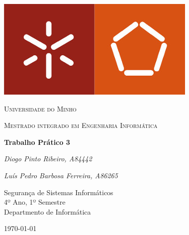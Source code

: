 \documentclass[12pt]{article}
\begin{document}
\thispagestyle{empty}
\setlength\headheight{0pt} 
\begin{center}

\begin{center}
\includegraphics[width=0.45\linewidth]{img/um_logo.jpg}            
\end{center}	

        \vspace{0.25cm}
        {\scshape\LARGE Universidade do Minho \par}
        \vspace{0.25cm}
        {\scshape\Large Mestrado integrado em Engenharia Informática\par}
        \vspace{0.5cm}

        {\Large\bfseries Trabalho Prático 3\par}
        
        \vspace{0.5cm}
        {\Large\itshape Diogo Pinto Ribeiro, A84442\par}
        {\Large\itshape Luís Pedro Barbosa Ferreira, A86265\par}
        \vspace{0.25cm}

\vspace{1cm}
Segurança de Sistemas Informáticos \\
4º Ano, 1º Semestre \\
Departmento de Informática\par
\vspace{1.5cm}
\large
\today

\end{center}

\clearpage
\restoregeometry
\justify

%
%
%

\renewcommand{\contentsname}{Contents}
\pagebreak

 






\printbibliography
\end{document}
